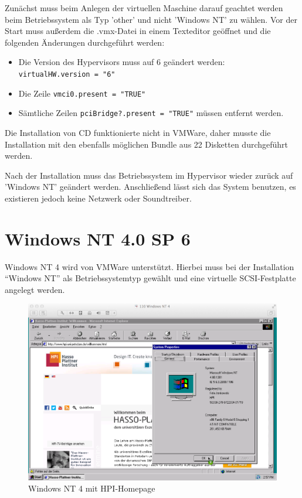 	Zunächst muss beim Anlegen der virtuellen Maschine darauf geachtet werden beim Betriebssystem als Typ 'other' und nicht 'Windows NT' zu wählen.
	Vor der Start muss außerdem die .vmx-Datei in einem Texteditor geöffnet und die folgenden Änderungen durchgeführt werden:

		\begin{itemize}
			\item Die Version des Hypervisors muss auf 6 geändert werden: \\ \texttt{virtualHW.version = \string"6\string"}
			\item Die Zeile \texttt{vmci0.present = \string"TRUE\string"}
			\item Sämtliche Zeilen \texttt{pciBridge?.present = \string"TRUE\string"} müssen entfernt werden.
		\end{itemize}


	Die Installation von CD funktionierte nicht in VMWare, daher musste die Installation mit den ebenfalls möglichen Bundle aus 22 Disketten durchgeführt werden. 

	Nach der Installation muss das Betriebssystem im Hypervisor wieder zurück auf 'Windows NT' geändert werden. 
	Anschließend lässt sich das System benutzen, es existieren jedoch keine Netzwerk oder Soundtreiber.


\section{Windows NT 4.0 SP 6}

	Windows NT 4 wird von VMWare unterstützt. 
	Hierbei muss bei der Installation "`Windows NT"' als Betriebssystemtyp gewählt und eine virtuelle SCSI-Festplatte angelegt werden. 
	
		\begin{figure}[h]
		\begin{center}
			\includegraphics[width=\textwidth]{img/nt4}
			\caption{Windows NT 4 mit HPI-Homepage}
			\label{fig:screenshot-nt4}
		\end{center}
	\end{figure}


